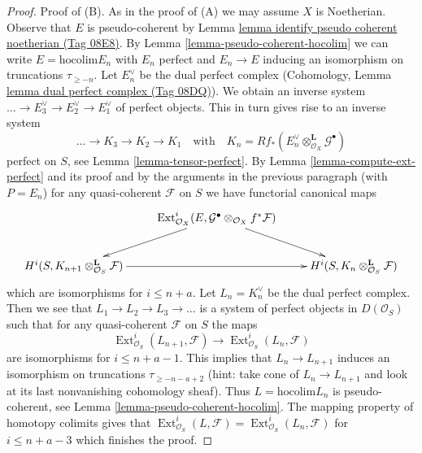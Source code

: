 \documentclass{amsart}
\theoremstyle{plain}
\theoremstyle{definition}
\theoremstyle{remark}
\numberwithin{equation}{subsection}
\def\Ext{\mathop{\mathrm{Ext}}\nolimits}
\begin{document}
\begin{proof}
\medskip\noindent
Proof of (B). As in the proof of (A) we may assume $X$ is Noetherian.
Observe that $E$ is pseudo-coherent by
Lemma \href{https://stacks.math.columbia.edu/tag/08E8}{lemma identify pseudo coherent noetherian (Tag 08E8)}.
By Lemma \ref{lemma-pseudo-coherent-hocolim} we can write
$E = \text{hocolim} E_n$ with $E_n$ perfect and $E_n \to E$ inducing
an isomorphism on truncations $\tau_{\geq -n}$. Let $E_n^\vee$
be the dual perfect complex
(Cohomology, Lemma \href{https://stacks.math.columbia.edu/tag/08DQ}{lemma dual perfect complex (Tag 08DQ)}).
We obtain an inverse system $\ldots \to E_3^\vee \to E_2^\vee \to E_1^\vee$
of perfect objects. This in turn gives rise to an inverse system
$$
\ldots \to K_3 \to K_2 \to K_1\quad\text{with}\quad
K_n = Rf_*(E_n^\vee \otimes_{\mathcal{O}_X}^\mathbf{L} \mathcal{G}^\bullet)
$$
perfect on $S$, see Lemma \ref{lemma-tensor-perfect}.
By Lemma \ref{lemma-compute-ext-perfect} and its proof and
by the arguments in the previous paragraph (with $P = E_n$)
for any quasi-coherent $\mathcal{F}$ on $S$ we have
functorial canonical maps
$$
\xymatrix{
& \Ext^i_{\mathcal{O}_X}(E,
\mathcal{G}^\bullet \otimes_{\mathcal{O}_X} f^*\mathcal{F})
\ar[ld] \ar[rd] \\
H^i(S, K_{n + 1} \otimes_{\mathcal{O}_S}^\mathbf{L} \mathcal{F})
\ar[rr] & &
H^i(S, K_n \otimes_{\mathcal{O}_S}^\mathbf{L} \mathcal{F})
}
$$
which are isomorphisms for $i \leq n + a$.
Let $L_n = K_n^\vee$ be the dual perfect complex.
Then we see that $L_1 \to L_2 \to L_3 \to \ldots$
is a system of perfect objects in $D(\mathcal{O}_S)$
such that for any quasi-coherent $\mathcal{F}$ on $S$
the maps
$$
\Ext^i_{\mathcal{O}_S}(L_{n + 1}, \mathcal{F})
\longrightarrow
\Ext^i_{\mathcal{O}_S}(L_n, \mathcal{F})
$$
are isomorphisms for $i \leq n + a - 1$. This implies that
$L_n \to L_{n + 1}$ induces an isomorphism on truncations
$\tau_{\geq -n - a + 2}$ (hint: take cone of $L_n \to L_{n + 1}$
and look at its last nonvanishing cohomology sheaf).
Thus $L = \text{hocolim} L_n$ is pseudo-coherent, see
Lemma \ref{lemma-pseudo-coherent-hocolim}. The mapping property
of homotopy colimits gives that
$\Ext^i_{\mathcal{O}_S}(L, \mathcal{F}) =
\Ext^i_{\mathcal{O}_S}(L_n, \mathcal{F})$
for $i \leq n + a - 3$ which finishes the proof.
\end{proof}
\end{document}
